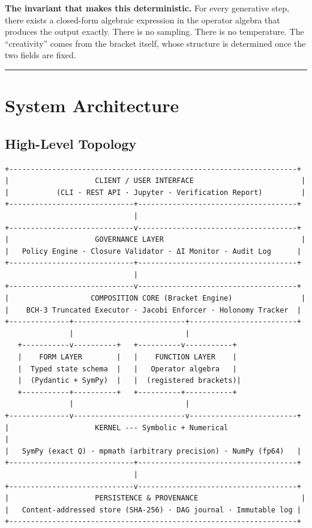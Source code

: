 \documentclass[11pt,a4paper]{article}
\begin{document}
\textbf{The invariant that makes this deterministic.} For every
generative step, there exists a closed-form algebraic expression in the
operator algebra that produces the output exactly. There is no sampling.
There is no temperature. The ``creativity'' comes from the bracket
itself, whose structure is determined once the two fields are fixed.

\begin{center}\rule{0.5\linewidth}{0.5pt}\end{center}

\hypertarget{system-architecture}{%
\section{System Architecture}\label{system-architecture}}

\hypertarget{high-level-topology}{%
\subsection{High-Level Topology}\label{high-level-topology}}

\begin{Verbatim}[breaklines=true,breakanywhere=true]
+-------------------------------------------------------------------+
|                    CLIENT / USER INTERFACE                         |
|           (CLI · REST API · Jupyter · Verification Report)         |
+-----------------------------+-------------------------------------+
                              |
+-----------------------------v-------------------------------------+
|                    GOVERNANCE LAYER                                |
|   Policy Engine · Closure Validator · ΔI Monitor · Audit Log      |
+-----------------------------+-------------------------------------+
                              |
+-----------------------------v-------------------------------------+
|                   COMPOSITION CORE (Bracket Engine)                |
|    BCH-3 Truncated Executor · Jacobi Enforcer · Holonomy Tracker  |
+--------------+--------------------------+-------------------------+
               |                          |
   +-----------v----------+   +----------v-----------+
   |    FORM LAYER        |   |    FUNCTION LAYER    |
   |  Typed state schema  |   |   Operator algebra   |
   |  (Pydantic + SymPy)  |   |  (registered brackets)|
   +-----------+----------+   +----------+-----------+
               |                          |
+--------------v--------------------------v-------------------------+
|                    KERNEL --- Symbolic + Numerical                  |
|   SymPy (exact Q) · mpmath (arbitrary precision) · NumPy (fp64)   |
+-----------------------------+-------------------------------------+
                              |
+-----------------------------v-------------------------------------+
|                    PERSISTENCE & PROVENANCE                        |
|   Content-addressed store (SHA-256) · DAG journal · Immutable log |
+-------------------------------------------------------------------+
\end{Verbatim}
\end{document}
